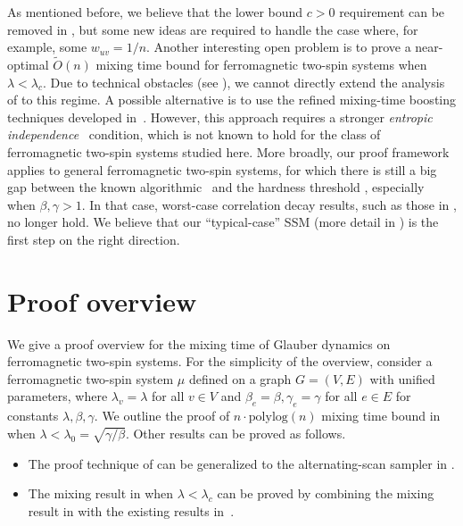 \documentclass[11pt]{amsart}
\theoremstyle{definition}
\theoremstyle{remark}
\begin{document}
As mentioned before, we believe that the lower bound $c>0$ requirement can be removed in ,
but some new ideas are required to handle the case where, for example, some $w_{uv}=1/n$.
Another interesting open problem is to prove a near-optimal $\widetilde{O}(n)$ mixing time bound for ferromagnetic two-spin systems when $\lambda < \lambda_c$. Due to technical obstacles (see ), we cannot directly extend the analysis of  to this regime. A possible alternative is to use the refined mixing-time boosting techniques developed in~\cite{Chen0YZ22,ChenE22,FY26}. 
However, this approach requires a stronger \emph{entropic independence}~\cite{AJKPV22} condition, which is not known to hold for the class of ferromagnetic two-spin systems studied here.
More broadly, our proof framework applies to general ferromagnetic two-spin systems,
for which there is still a big gap between the known algorithmic~\cite{GuoL18,GLL20,shao2021contraction} and the hardness threshold \cite{LiuLZ14},
especially when $\beta,\gamma>1$.
In that case, worst-case correlation decay results, such as those in \cite{GuoL18}, no longer hold. 
We believe that our ``typical-case'' SSM (more detail in ) is the first step on the right direction.

\section{Proof overview}\label{sec:proof-overview}
We give a proof overview for the mixing time of Glauber dynamics on ferromagnetic two-spin systems. For the simplicity of the overview, consider a ferromagnetic two-spin system $\mu$ defined on a graph $G=(V,E)$ with unified parameters, where $\lambda_v = \lambda$ for all $v \in V$ and $\beta_e = \beta, \gamma_e = \gamma$ for all $e \in E$ for constants $\lambda,\beta,\gamma$. We outline the proof of $n \cdot \mathrm{polylog}(n)$ mixing time bound in  when $\lambda < \lambda_0 = \sqrt{\gamma/\beta}$. Other results can be proved as follows.
\begin{itemize}
    \item The proof technique of  can be generalized to the alternating-scan sampler in .
    \item The mixing result in  when $\lambda < \lambda_c$ can be proved by combining the mixing result in  with the existing results in~\cite{CFYZ21}.
\end{itemize}
\end{document}
